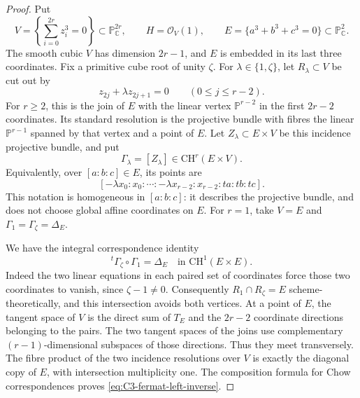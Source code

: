 \begin{proof}
Put
\[
 V=\left\{\sum_{i=0}^{2r}z_i^3=0\right\}\subset\mathbb P^{2r}_{\mathbb C},
 \qquad H=\mathcal O_V(1),
 \qquad E=\{a^3+b^3+c^3=0\}\subset\mathbb P^2_{\mathbb C}.
\]
The smooth cubic $V$ has dimension $2r-1$, and $E$ is embedded in
its last three coordinates. Fix a primitive cube root of unity
$\zeta$. For $\lambda\in\{1,\zeta\}$, let $R_\lambda\subset V$
be cut out by
\[
 z_{2j}+\lambda z_{2j+1}=0\qquad(0\le j\le r-2).
\]
For $r\ge2$, this is the join of $E$ with the linear vertex
$\mathbb P^{r-2}$ in the first $2r-2$ coordinates. Its standard
resolution is the projective bundle with fibres the linear
$\mathbb P^{r-1}$ spanned by that vertex and a point of $E$.
Let $Z_\lambda\subset E\times V$ be this incidence projective
bundle, and put
\[
 \Gamma_\lambda=[Z_\lambda]\in\mathrm{CH}^r(E\times V).
\]
Equivalently, over $[a:b:c]\in E$, its points are
\[
 [-\lambda x_0:x_0:\cdots:-\lambda x_{r-2}:x_{r-2}:ta:tb:tc].
\]
This notation is homogeneous in $[a:b:c]$: it describes the
projective bundle, and does not choose global affine coordinates
on $E$. For $r=1$, take $V=E$ and $\Gamma_1=\Gamma_\zeta=\Delta_E$.

We have the integral correspondence identity
\begin{equation}\label{eq:C3-fermat-left-inverse}
             {}^t\Gamma_\zeta\circ\Gamma_1=\Delta_E
                         \quad\text{in }\mathrm{CH}^1(E\times E).
\end{equation}
Indeed the two linear equations in each paired set of coordinates
force those two coordinates to vanish, since $\zeta-1\ne0$.
Consequently $R_1\cap R_\zeta=E$ scheme-theoretically, and this
intersection avoids both vertices. At a point of $E$, the tangent
space of $V$ is the direct sum of $T_E$ and the $2r-2$ coordinate
directions belonging to the pairs. The two tangent spaces of the
joins use complementary $(r-1)$-dimensional subspaces of those
directions. Thus they meet transversely. The fibre product of
the two incidence resolutions over $V$ is exactly the diagonal
copy of $E$, with intersection multiplicity one. The composition
formula for Chow correspondences proves
\eqref{eq:C3-fermat-left-inverse}.


\end{proof}
